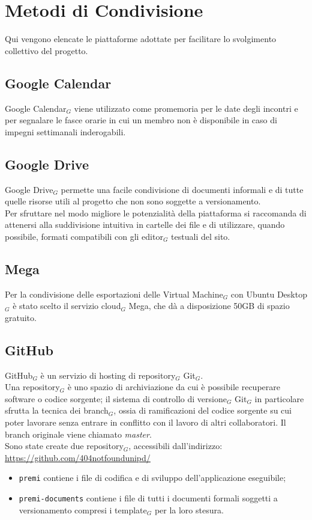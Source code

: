 \section{Metodi di Condivisione}
Qui vengono elencate le piattaforme adottate per facilitare lo svolgimento collettivo del progetto.

\subsection{Google Calendar}
Google Calendar$_G$ viene utilizzato come promemoria per le date degli incontri e per segnalare le fasce orarie in cui un membro non è disponibile in caso di impegni settimanali inderogabili.

\subsection{Google Drive}
Google Drive$_G$ permette una facile condivisione di documenti informali e di tutte quelle risorse utili al progetto che non sono soggette a versionamento. \\
Per sfruttare nel modo migliore le potenzialità della piattaforma si raccomanda di attenersi alla suddivisione intuitiva in cartelle dei file e di utilizzare, quando possibile, formati compatibili con gli editor$_G$ testuali del sito.

\subsection{Mega}
Per la condivisione delle esportazioni delle Virtual Machine$_{G}$ con Ubuntu Desktop$_{G}$ è stato scelto il servizio cloud$_{G}$ Mega, che dà a disposizione 50GB di spazio gratuito.

\subsection{GitHub}
GitHub$_G$ è un servizio di hosting di repository$_G$ Git$_G$. \\
Una repository$_G$ è uno spazio di archiviazione da cui è possibile recuperare software o codice sorgente; il sistema di controllo di versione$_G$ Git$_G$ in particolare sfrutta la tecnica dei branch$_G$, ossia di ramificazioni del codice sorgente su cui poter lavorare senza  entrare in conflitto con il lavoro di altri collaboratori. Il branch originale viene chiamato \textit{master}. \\
Sono state create due repository$_G$, accessibili dall'indirizzo:\\ 
\url{https://github.com/404notfoundunipd/}
\begin{itemize}
\item \texttt{premi} contiene i file di codifica e di sviluppo dell'applicazione eseguibile;
\item \texttt{premi-documents} contiene i file di tutti i documenti formali soggetti a versionamento compresi i template$_G$ per la loro stesura.
\end{itemize}

